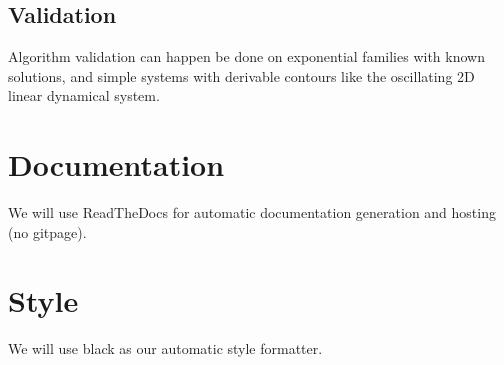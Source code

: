 \documentclass[11pt]{article}
\begin{document}
\subsection{Validation}
Algorithm validation can happen be done on exponential families with known solutions, and simple systems with derivable contours like the oscillating 2D linear dynamical system.

\section{Documentation}
We will use ReadTheDocs for automatic documentation generation and hosting (no gitpage).

\section{Style}
We will use black as our automatic style formatter.



\end{document}
